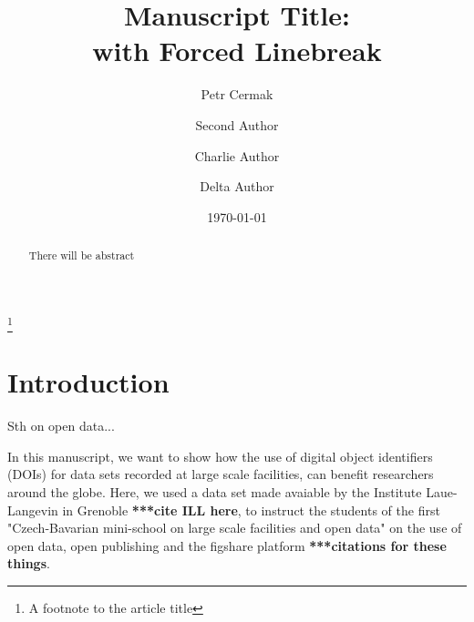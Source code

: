 \documentclass[%
 reprint,
 amsmath,amssymb,
 aps,
]{revtex4-2}
\begin{document}

\title{Manuscript Title:\\with Forced Linebreak}%
\thanks{A footnote to the article title}%

\author{Petr Cermak}
 
\author{Second Author}%
%


\author{Charlie Author}
%
%
\author{Delta Author}
%


\date{\today}%

\begin{abstract}
There will be abstract
\end{abstract}

\maketitle



\section{Introduction}

Sth on open data...

In this manuscript, we want to show how the use of digital object identifiers (DOIs) for data sets recorded at large scale facilities, can benefit researchers around the globe. 
Here, we used a data \cite{data} set made avaiable by the Institute Laue-Langevin in Grenoble \cite{ILL} \textbf{***cite ILL here}, to instruct the students of the first "Czech-Bavarian mini-school on large scale facilities and open data" \cite{mini-school} on the use of open data, open publishing and the figshare platform \textbf{***citations for these things}. 
\end{document}
